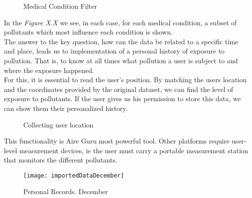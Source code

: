 \begin{figure}[ht]
  \centering
  \hfill
  \hfill
  \caption{Medical Condition Filter}
\end{figure}

In the \textit{Figure X.X} we see, in each case, for each medical condition, a subset of pollutants which most influence each condition is shown.\\
  
The answer to the key question, how can the data be related to a specific time and place, leads us to
implementation of a personal history of exposure to pollution. That is, to know at all times what pollution
a user is subject to and where the exposure happened.\\

For this, it is essential to read the user's position. By matching the users location and the coordinates provided by the original dataset, we can find the level of exposure to pollutants.
If the user gives us his permission to store this data, we can show them their personalized history.

\begin{figure}[ht]
  \centering 
  \caption{Collecting user location}
\end{figure}

This functionality is Aire Guru most powerful tool. Other platforms require user-level measurement devices, ie the user must carry
a portable measurement station that monitors the different pollutants. \\

\begin{figure}[ht]
  \centering
  \texttt{[image: importedDataDecember]}
  \caption{Personal Records. December}
\end{figure}

